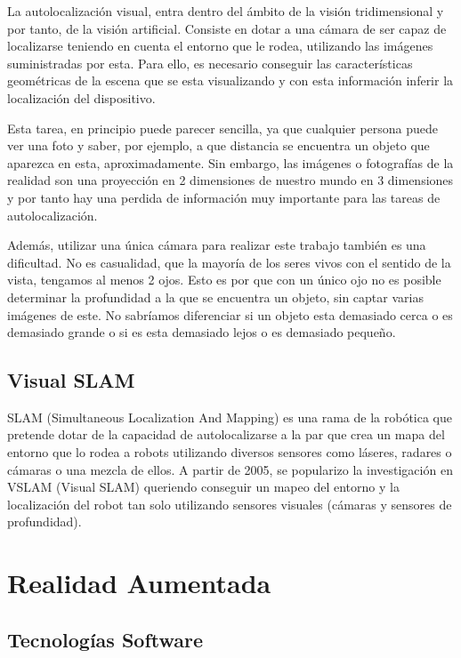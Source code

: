 \documentclass[a4paper, 12pt]{book}
\begin{document}
La autolocalización visual, entra dentro del ámbito de la visión tridimensional y por tanto, de la visión artificial. Consiste en dotar a una cámara de ser capaz de localizarse teniendo en cuenta el entorno que le rodea, utilizando las imágenes suministradas por esta. Para ello, es necesario conseguir las características geométricas de la escena que se esta visualizando y con esta información inferir la localización del dispositivo.

Esta tarea, en principio puede parecer sencilla, ya que cualquier persona puede ver una foto y saber, por ejemplo, a que distancia se encuentra un objeto que aparezca en esta, aproximadamente. Sin embargo, las imágenes o fotografías de la realidad son una proyección en 2 dimensiones de nuestro mundo en 3 dimensiones y por tanto hay una perdida de información muy importante para las tareas de autolocalización.

Además, utilizar una única cámara para realizar este trabajo también es una dificultad. No es casualidad, que la mayoría de los seres vivos con el sentido de la vista, tengamos al menos 2 ojos. Esto es por que con un único ojo no es posible determinar la profundidad a la que se encuentra un objeto, sin captar varias imágenes de este. No sabríamos diferenciar si un objeto esta demasiado cerca o es demasiado grande o si es esta demasiado lejos o es demasiado pequeño.

\subsection{Visual SLAM}
\label{subsec:visualslam}

SLAM (Simultaneous Localization And Mapping) es una rama de la robótica que pretende dotar de la capacidad de autolocalizarse a la par que crea un mapa del entorno que lo rodea a robots utilizando diversos sensores como láseres, radares o cámaras o una mezcla de ellos.
A partir de 2005, se popularizo la investigación en VSLAM (Visual SLAM) queriendo conseguir un mapeo del entorno y la localización del robot tan solo utilizando sensores visuales (cámaras y sensores de profundidad).

\section{Realidad Aumentada}
\label{sec:realidadaumentada}

\subsection{Tecnologías Software}
\label{subsec:tecnosoftware}
\end{document}
